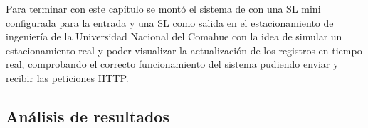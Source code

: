 Para terminar con este capítulo se montó el sistema de con una SL mini configurada para la entrada y una SL como salida en el estacionamiento de ingeniería de la Universidad Nacional del Comahue con la idea de simular un estacionamiento real y poder visualizar la actualización de los registros en tiempo real, comprobando el correcto funcionamiento del sistema pudiendo enviar y recibir las peticiones HTTP.


\subsection{Análisis de resultados}


